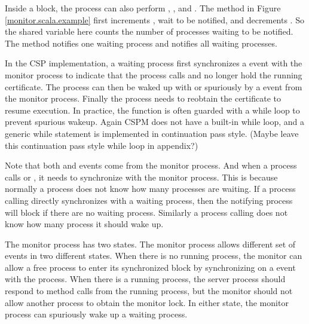 \documentclass{article}
\begin{document}
Inside a  block, the process can also perform , , and . The method  in Figure \ref{monitor.scala.example} first increments , wait to be notified, and decrements . So the shared variable  here counts the number of processes waiting to be notified. The method  notifies one waiting process and  notifies all waiting processes. 

In the CSP implementation, a waiting process first synchronizes a  event with the monitor process to indicate that the process calls  and no longer hold the running certificate. The process can then be waked up with  or spuriously by a event  from the monitor process. Finally the process needs to reobtain the certificate  to resume execution. In practice, the  function is often guarded with a while loop to prevent spurious wakeup. Again CSPM does not have a built-in while loop, and a generic while statement is implemented in continuation pass style. (Maybe leave this continuation pass style while loop in appendix?)

Note that both  and  events come from the monitor process. And when a process calls  or , it needs to synchronize with the monitor process. This is because normally a process does not know how many processes are waiting. If a process calling  directly synchronizes with a waiting process, then the notifying process will block if there are no waiting process. Similarly a process calling  does not know how many process it should wake up. 

The monitor process has two states. The monitor process allows different set of events in two different states. When there is no running process, the monitor can allow a free process to enter its synchronized block by synchronizing on a  event with the process. When there is a running process, the server process should respond to method calls from the running process, but the monitor should not allow another process to obtain the monitor lock. In either state, the monitor process can spuriously wake up a waiting process.
\end{document}
